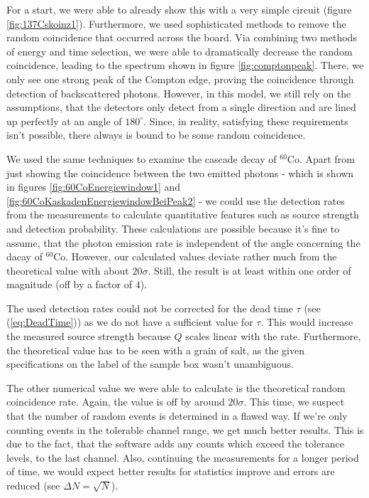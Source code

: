 For a start, we were able to already show this with a very simple circuit (figure \ref{fig:137Cskoinz1}).
Furthermore, we used sophisticated methods to remove the random coincidence that occurred across the board.
Via combining two methods of energy and time selection, we were able to dramatically decrease the random coincidence, leading to the spectrum shown in figure \ref{fig:comptonpeak}.
There, we only see one strong peak of the Compton edge, proving the coincidence through detection of backscattered photons.
However, in this model, we still rely on the assumptions, that the detectors only detect from a single direction and are lined up perfectly at an angle of $180^{\circ}$.
Since, in reality, satisfying these requirements isn't possible, there always is bound to be some random coincidence.
%
\par
%
We used the same techniques to examine the cascade decay of $^{60}\text{Co}$.
Apart from just showing the coincidence between the two emitted photons - which is shown in figures \ref{fig:60CoEnergiewindow1} and \ref{fig:60CoKaskadenEnergiewindowBeiPeak2} - we could use the detection rates from the measurements to calculate quantitative features such as source strength and detection probability.
These calculations are possible because it's fine to assume, that the photon emission rate is independent of the angle concerning the dacay of $^{60}\text{Co}$.
However, our calculated values deviate rather much from the theoretical value with about $20 \sigma$.
Still, the result is at least within one order of magnitude (off by a factor of $4$).
%
\par
%
The used detection rates could not be corrected for the dead time $\tau$ (see (\ref{eq:DeadTime})) as we do not have a sufficient value for $\tau$.
This would increase the measured source strength because $Q$ scales linear with the rate.
Furthermore, the theoretical value has to be seen with a grain of salt, as the given specifications on the label of the sample box wasn't unambiguous.
%
\par
%
The other numerical value we were able to calculate is the theoretical random coincidence rate.
Again, the value is off by around $20 \sigma$.
This time, we suspect that the number of random events is determined in a flawed way.
If we're only counting events in the tolerable channel range, we get much better results.
This is due to the fact, that the software adds any counts which exceed the tolerance levels, to the last channel.
Also, continuing the measurements for a longer period of time, we would expect better results for statistics improve and errors are reduced (see $\Delta N = \sqrt{N}$).
